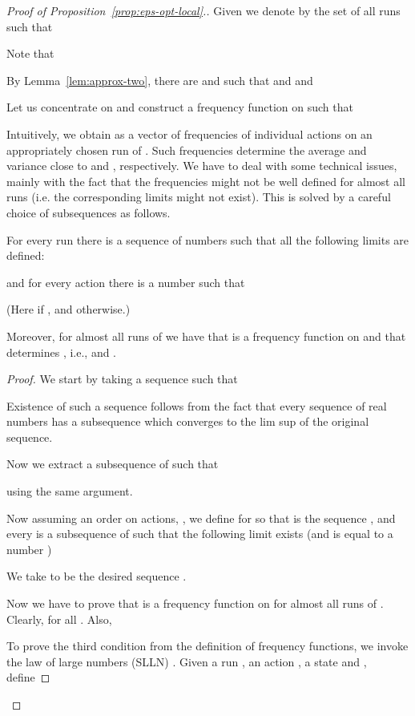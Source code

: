 \medskip\noindent
\begin{proof}[Proof of Proposition~\ref{prop:eps-opt-local}.]
Given  we denote by  the set of all runs  such that

Note that 

By Lemma~\ref{lem:approx-two}, there are  and  such that  and  and 

Let us concentrate on  and construct a frequency function  on  such that

Intuitively, we obtain  as a vector of frequencies of individual actions on an appropriately chosen run of . Such frequencies determine the average and variance close to  and , respectively. We have to deal with some technical issues, mainly with the fact that the frequencies might not be well defined for almost all runs (i.e. the corresponding limits might not exist). This is solved by a careful choice of subsequences as follows.
\begin{claim}\label{claim:subsequence-local}
For every run  there is a sequence of numbers  such that
all the following limits are defined:

and for every action  there is a number  such that

(Here  if , and  otherwise.)

Moreover, for almost all runs  of  we have that  is a frequency function on  and that 
 determines , i.e.,
 and .
\end{claim}
\begin{proof}
We start by taking a sequence  such that

Existence of such a sequence follows from the fact that every sequence of real numbers has a subsequence which converges to the lim sup of the original sequence.

Now we extract a subsequence  of  such that 

using the same argument.

Now assuming an order on actions, , we define  for  so that  is the sequence , and
every  is a subsequence of  
such that the following limit exists (and is equal to a number )

We take  to be the desired sequence .

Now we have to prove that  is a frequency function on  for almost all runs of . Clearly,  for all . Also,

To prove the third condition from the definition of frequency functions, we invoke the law of large numbers (SLLN) \cite{Billingsley:book}. Given a run , an action , a state  and , define


\end{proof}
\end{proof}
